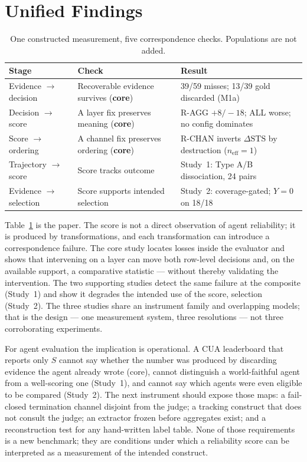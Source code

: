 \documentclass[sigconf,anonymous]{aamas}
\newcommand{\STS}{\mathrm{STS}}
\begin{document}
\section{Unified Findings}
\label{sec:unified}

\begin{table}[t]
\centering
\caption{One constructed measurement, five correspondence checks. Populations are not added.}
\label{tab:unified}
\small
\begin{tabular}{p{}p{}p{}}
\toprule
Stage & Check & Result \\
\midrule
Evidence $\to$ decision & Recoverable evidence survives (\textbf{core}) & 39/59 misses; 13/39 gold discarded (M1a) \\
Decision $\to$ score & A layer fix preserves meaning (\textbf{core}) & R-AGG $+8/-18$; ALL worse; no config dominates \\
Score $\to$ ordering & A channel fix preserves ordering (\textbf{core}) & R-CHAN inverts $\Delta\STS$ by destruction ($n_{\mathrm{eff}}=1$) \\
Trajectory $\to$ score & Score tracks outcome & Study~1: Type A/B dissociation, 24 pairs \\
Evidence $\to$ selection & Score supports intended selection & Study~2: coverage-gated; $Y{=}0$ on 18/18 \\
\bottomrule
\end{tabular}
\end{table}

Table~\ref{tab:unified} is the paper.
The score is not a direct observation of agent reliability; it is produced by transformations, and each transformation can introduce a correspondence failure.
The core study locates losses inside the evaluator and shows that intervening on a layer can move both row-level decisions and, on the available support, a comparative statistic --- without thereby validating the intervention.
The two supporting studies detect the same failure at the composite (Study~1) and show it degrades the intended use of the score, selection (Study~2).
The three studies share an instrument family and overlapping models; that is the design --- one measurement system, three resolutions --- not three corroborating experiments.

For agent evaluation the implication is operational.
A CUA leaderboard that reports only $S$ cannot say whether the number was produced by discarding evidence the agent already wrote (core), cannot distinguish a world-faithful agent from a well-scoring one (Study~1), and cannot say which agents were even eligible to be compared (Study~2).
The next instrument should expose those maps: a fail-closed termination channel disjoint from the judge; a tracking construct that does not consult the judge; an extractor frozen before aggregates exist; and a reconstruction test for any hand-written label table.
None of those requirements is a new benchmark; they are conditions under which a reliability score can be interpreted as a measurement of the intended construct.
\end{document}
